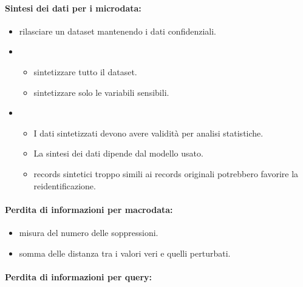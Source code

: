 \paragraph{Sintesi dei dati per i microdata:}

\begin{itemize}
  \item {} rilasciare un dataset mantenendo i dati confidenziali.
  \item {}
    \begin{itemize}
      \item {} sintetizzare tutto il dataset. 
      \item {} sintetizzare solo le variabili sensibili.
    \end{itemize}
  \item {}
    \begin{itemize}
      \item I dati sintetizzati devono avere validità per analisi statistiche.
      \item La sintesi dei dati dipende dal modello usato. 
        \item {} records sintetici troppo simili ai records originali potrebbero favorire la reidentificazione.
    \end{itemize}
\end{itemize}


\paragraph{Perdita di informazioni per macrodata:}

\begin{itemize}
  \item {} misura del numero delle soppressioni.
  \item {} somma delle distanza tra i valori veri e quelli perturbati.
\end{itemize}

\paragraph{Perdita di informazioni per query:}

